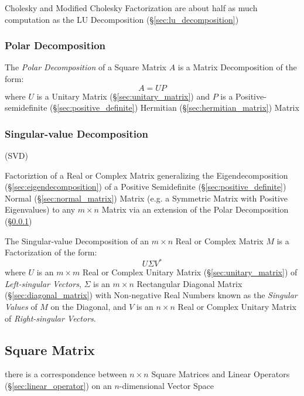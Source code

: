 Cholesky and Modified Cholesky Factorization are about half as much computation
as the LU Decomposition (\S\ref{sec:lu_decomposition})



\subsubsection{Polar Decomposition}\label{sec:polar_decomposition}

The \emph{Polar Decomposition} of a Square Matrix $A$ is a Matrix Decomposition
of the form:
\[
  A = U P
\]
where $U$ is a Unitary Matrix (\S\ref{sec:unitary_matrix}) and $P$ is a
Positive-semidefinite (\S\ref{sec:positive_definite}) Hermitian
(\S\ref{sec:hermitian_matrix}) Matrix



\subsubsection{Singular-value Decomposition}\label{sec:svd}

(SVD)

Factoriztion of a Real or Complex Matrix generalizing the Eigendecomposition
(\S\ref{sec:eigendecomposition}) of a Positive Semidefinite
(\S\ref{sec:positive_definite}) Normal (\S\ref{sec:normal_matrix}) Matrix (e.g.
a Symmetric Matrix with Positive Eigenvalues) to any $m \times n$ Matrix via an
extension of the Polar Decomposition (\S\ref{sec:polar_decomposition})

The Singular-value Decomposition of an $m \times n$ Real or Complex Matrix $M$
is a Factorization of the form:
\[
  U \Sigma V^*
\]
where $U$ is an $m \times m$ Real or Complex Unitary Matrix
(\S\ref{sec:unitary_matrix}) of \emph{Left-singular Vectors}, $\Sigma$ is an $m
\times n$ Rectangular Diagonal Matrix (\S\ref{sec:diagonal_matrix}) with
Non-negative Real Numbers known as the \emph{Singular Values} of $M$ on the
Diagonal, and $V$ is an $n \times n$ Real or Complex Unitary Matrix of
\emph{Right-singular Vectors}.



\subsection{Square Matrix}\label{sec:square_matrix}

there is a correspondence between $n\times{n}$ Square Matrices and Linear
Operators (\S\ref{sec:linear_operator}) on an $n$-dimensional Vector Space

